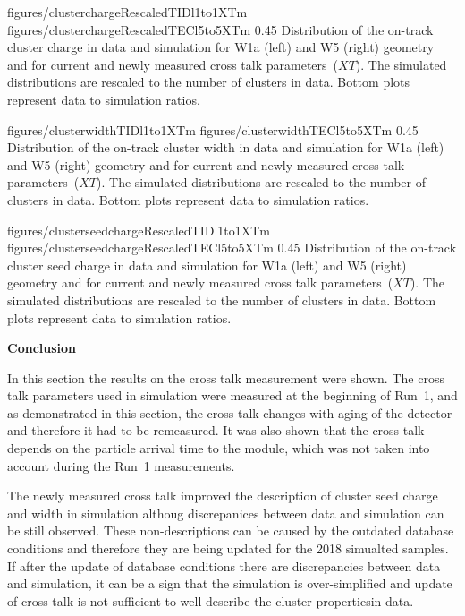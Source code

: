                  {figures/clusterchargeRescaledTIDl1to1XTm} %
                 {figures/clusterchargeRescaledTECl5to5XTm} %
                 {0.45}       %
                 { Distribution of the on-track cluster charge in data and simulation for W1a (left) and W5 (right) geometry and for current and newly measured cross talk parameters~($XT$).  The simulated distributions are rescaled to the number of clusters in data.  Bottom plots represent data to simulation ratios. }

                 {figures/clusterwidthTIDl1to1XTm}
                 {figures/clusterwidthTECl5to5XTm}
                 {0.45}       %
                 { Distribution of the on-track cluster width in data and simulation for W1a (left) and W5 (right) geometry and for current and newly measured cross talk parameters~($XT$).  The simulated distributions are rescaled to the number of clusters in data.  Bottom plots represent data to simulation ratios. }

                 {figures/clusterseedchargeRescaledTIDl1to1XTm} %
                 {figures/clusterseedchargeRescaledTECl5to5XTm} %
                 {0.45}       %
                 { Distribution of the on-track cluster seed charge in data and simulation for W1a (left) and W5 (right) geometry and for current and newly measured cross talk parameters~($XT$).  The simulated distributions are rescaled to the number of clusters in data.  Bottom plots represent data to simulation ratios. }

\textbf{Conclusion}

In this section the results on the cross talk measurement were shown. The cross talk parameters used in simulation were measured at the beginning of Run~1, and as demonstrated in this section, the cross talk changes with aging of the detector and therefore it had to be remeasured. It was also shown that the cross talk depends on the particle arrival time to the module, which was not taken into account during the Run~1 measurements. 

The newly measured cross talk improved the description of cluster seed charge and width in  simulation althoug discrepanices between data and simulation can be still observed. These non-descriptions can be caused by the outdated database conditions and therefore they are being updated for the 2018 simualted samples. If after the update of database conditions there are discrepancies between data and simulation, it can be a sign that the simulation is over-simplified and update of cross-talk is not sufficient to well describe the cluster propertiesin data.

